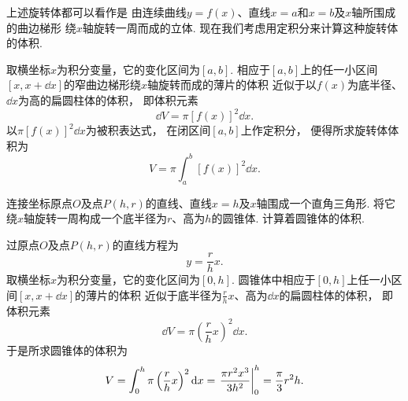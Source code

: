 上述旋转体都可以看作是
由连续曲线\(y=f(x)\)、直线\(x=a\)和\(x=b\)及\(x\)轴所围成的曲边梯形
绕\(x\)轴旋转一周而成的立体.
现在我们考虑用定积分来计算这种旋转体的体积.

取横坐标\(x\)为积分变量，它的变化区间为\([a,b]\).
相应于\([a,b]\)上的任一小区间\([x,x+\dd{x}]\)的窄曲边梯形绕\(x\)轴旋转而成的薄片的体积
近似于以\(f(x)\)为底半径、\(\dd{x}\)为高的扁圆柱体的体积，
即体积元素\begin{equation*}
	\dd{V} = \pi [f(x)]^2 \dd{x}.
\end{equation*}
以\(\pi [f(x)]^2 \dd{x}\)为被积表达式，
在闭区间\([a,b]\)上作定积分，
便得所求旋转体体积为\begin{equation}\label{equation:定积分.曲边梯形绕x轴旋转体的体积}
	V = \pi \int_a^b [f(x)]^2 \dd{x}.
\end{equation}

\begin{example}
连接坐标原点\(O\)及点\(P(h,r)\)的直线、直线\(x=h\)及\(x\)轴围成一个直角三角形.
将它绕\(x\)轴旋转一周构成一个底半径为\(r\)、高为\(h\)的圆锥体.
计算着圆锥体的体积.
\begin{solution}
过原点\(O\)及点\(P(h,r)\)的直线方程为\begin{equation*}
	y = \frac{r}{h} x.
\end{equation*}
取横坐标\(x\)为积分变量，它的变化区间为\([0,h]\).
圆锥体中相应于\([0,h]\)上任一小区间\([x,x+\dd{x}]\)的薄片的体积
近似于底半径为\(\frac{r}{h} x\)、高为\(\dd{x}\)的扁圆柱体的体积，
即体积元素\begin{equation*}
	\dd{V} = \pi \left(\frac{r}{h} x\right)^2 \dd{x}.
\end{equation*}
于是所求圆锥体的体积为\begin{equation*}
	V = \int_0^h \pi \left(\frac{r}{h} x\right)^2 \dd{x}
	= \eval{\frac{\pi r^2 x^3}{3 h^2}}_0^h
	= \frac\pi3 r^2 h.
\end{equation*}
\end{solution}
\end{example}

